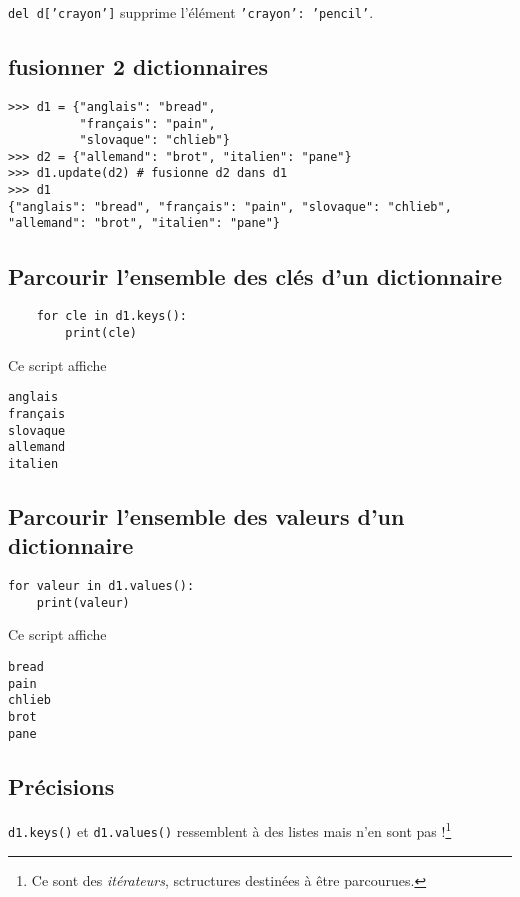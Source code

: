 \texttt{del d['crayon']} supprime l'élément \texttt{'crayon': 'pencil'}.

\subsection*{fusionner 2 dictionnaires}
\begin{verbatim}
>>> d1 = {"anglais": "bread", 
          "français": "pain", 
          "slovaque": "chlieb"}
>>> d2 = {"allemand": "brot", "italien": "pane"}
>>> d1.update(d2) # fusionne d2 dans d1
>>> d1
{"anglais": "bread", "français": "pain", "slovaque": "chlieb", "allemand": "brot", "italien": "pane"}
\end{verbatim}

\subsection{Parcourir l'ensemble des clés d'un dictionnaire}
\begin{pyc}
    \begin{verbatim}
    for cle in d1.keys():
        print(cle)
    \end{verbatim}
\end{pyc}
Ce script affiche
\begin{verbatim}
anglais
français
slovaque
allemand
italien
\end{verbatim}

\subsection{Parcourir l'ensemble des valeurs d'un dictionnaire}
\begin{pyc}
    \begin{verbatim}
for valeur in d1.values():
    print(valeur)
\end{verbatim}
\end{pyc}
Ce script affiche
\begin{verbatim}
bread
pain
chlieb
brot
pane
\end{verbatim}

\subsection{Précisions}
\texttt{d1.keys()} et \texttt{d1.values()} ressemblent à des listes mais n'en sont pas !\footnote{Ce sont des \textit{itérateurs}, sctructures destinées à être parcourues. }\\


